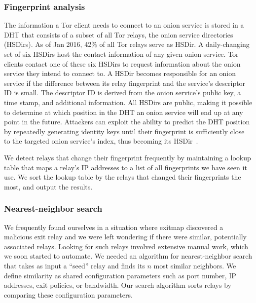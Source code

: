 \subsubsection{Fingerprint analysis}
\label{sec:fingerprint-analysis}
The information a Tor client needs to connect to an onion service is stored in a
DHT that consists of a subset of all Tor relays, the onion service directories
(HSDirs).  As of Jan 2016, 42\% of all Tor relays serve as HSDir.  A
daily-changing set of six HSDirs host the contact information of any given
onion service.  Tor clients contact one of these six HSDirs to request
information about the onion service they intend to connect to.  A HSDir becomes
responsible for an onion service if the difference between its relay fingerprint
and the service's descriptor ID is small.  The descriptor ID is derived from the
onion service's public key, a time stamp, and additional information.
All HSDirs are public, making it possible to determine at which position in the
DHT an onion service will end up at any point in the future.  Attackers can
exploit the ability to predict the DHT position by repeatedly generating
identity keys until their fingerprint is sufficiently close to the targeted
onion service's index, thus becoming its HSDir~\cite{Biryukov2013a}.

We detect relays that change their fingerprint frequently by maintaining a
lookup table that maps a relay's IP addresses to a list of all fingerprints we
have seen it use.  We sort the lookup table by the relays that changed their
fingerprints the most, and output the results.

\subsubsection{Nearest-neighbor search}
\label{sec:nearest-neighbor}
We frequently found ourselves in a situation where exitmap discovered a
malicious exit relay and we were left wondering if there were similar,
potentially associated relays.  Looking for such relays involved extensive
manual work, which we soon started to automate.  We needed an algorithm for
nearest-neighbor search that takes as input a ``seed'' relay and finds its $n$
most similar neighbors.  We define similarity as shared configuration parameters
such as port number, IP addresses, exit policies, or bandwidth.  Our search
algorithm sorts relays by comparing these configuration parameters.

